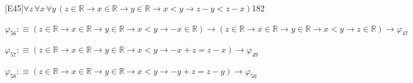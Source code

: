 \begin{fullproof}{[E45]}{$\forall z\,\forall x\,\forall y\,(z \in \mathbb{R} \to x \in \mathbb{R} \to y \in \mathbb{R} \to x < y \to z - y < z - x)$}{182}
\begin{abbrevlist}
\item $\varphi_{56} :\equiv (z \in \mathbb{R} \to x \in \mathbb{R} \to y \in \mathbb{R} \to x < y \to -x \in \mathbb{R}) \to (z \in \mathbb{R} \to x \in \mathbb{R} \to y \in \mathbb{R} \to x < y \to z \in \mathbb{R}) \to \varphi_{47}$
\item $\varphi_{57} :\equiv (z \in \mathbb{R} \to x \in \mathbb{R} \to y \in \mathbb{R} \to x < y \to -x + z = z - x) \to \varphi_{49}$
\item $\varphi_{58} :\equiv (z \in \mathbb{R} \to x \in \mathbb{R} \to y \in \mathbb{R} \to x < y \to -y + z = z - y) \to \varphi_{50}$
\end{abbrevlist}
\end{fullproof}
